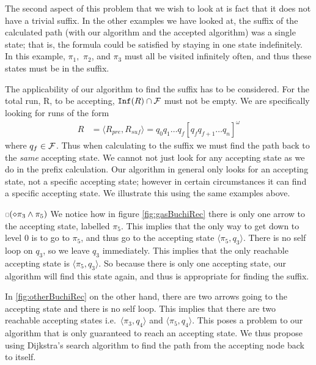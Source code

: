 The second aspect of this problem that we wish to look at is fact that it does not have a trivial suffix. In the other examples we have looked at, the suffix of the calculated path (with our algorithm and the accepted algorithm) was a single state; that is, the formula could be satisfied by staying in one state indefinitely. In this example, $\pi_1,$ $\pi_2$, and $\pi_3$ must all be visited infinitely often, and thus these states must be in the suffix. 

The applicability of our algorithm to find the suffix has to be considered. For the total run, R, to be accepting, $\texttt{Inf}(R) \cap \mathcal{F}$ must not be empty. We are specifically looking for runs of the form 
\begin{align*}
R &= \langle R_{pre}, R_{suf} \rangle = q_0 q_1 \dots q_f [q_f q_{f+1} \dots q_n]^\omega
\end{align*}     
where $q_f \in \mathcal{F}$. Thus when calculating to the suffix we must find the path back to the \textit{same} accepting state. We cannot not just look for any accepting state as we do in the prefix calculation. Our algorithm in general only looks for an accepting state, not a specific accepting state; however in certain circumstances it can find a specific accepting state. We illustrate this using the same examples above. 

$\ssquare (\diamond \pi_3 \wedge \pi_5)$ 
We notice how in figure \ref{fig:gasBuchiRec} there is only one arrow to the accepting state, labelled $\pi_5$. This implies that the only way to get down to level 0 is to go to $\pi_5$, and thus go to the accepting state $\langle \pi_5, q_3 \rangle$. There is no self loop on $q_3$, so we leave $q_3$ immediately. This implies that the only reachable accepting state is $\langle \pi_5, q_3 \rangle$. So because there is only one accepting state, our algorithm will find this state again, and thus is appropriate for finding the suffix. 

In \ref{fig:otherBuchiRec} on the other hand, there are two arrows going to the accepting state and there is no self loop. This implies that there are two reachable accepting states i.e.\ $\langle \pi_3, q_4 \rangle$ and $\langle \pi_5, q_4 \rangle$. This poses a problem to our algorithm that is only guaranteed to reach an accepting state. We thus propose using Dijkstra's search algorithm to find the path from the accepting node back to itself.   
